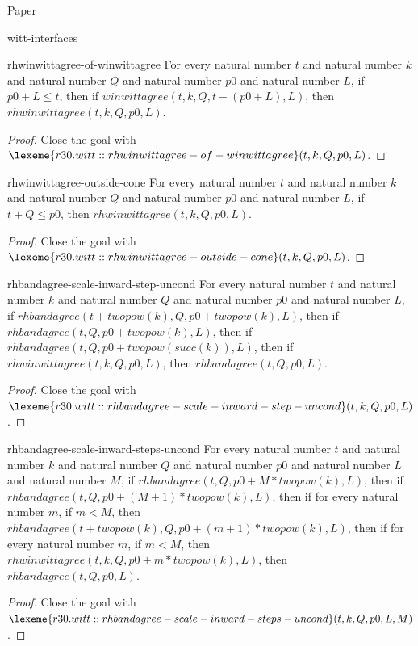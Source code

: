 \begin{lexlean}{Paper}
\begin{section}{witt-interfaces}
  \begin{theorem}{rhwinwittagree-of-winwittagree}
  For every natural number \(t\) and natural number \(k\) and natural number \(Q\) and natural number \(p0\) and natural number \(L\), if \(p0 + L ≤ t\), then if \(winwittagree(t, k, Q, t - (p0 + L), L)\), then \(rhwinwittagree(t, k, Q, p0, L)\).
  \begin{proof}
  Close the goal with \(\lexeme{r30.witt::rhwinwittagree-of-winwittagree}(t, k, Q, p0, L)\).
  \end{proof}
  \end{theorem}

  \begin{theorem}{rhwinwittagree-outside-cone}
  For every natural number \(t\) and natural number \(k\) and natural number \(Q\) and natural number \(p0\) and natural number \(L\), if \(t + Q ≤ p0\), then \(rhwinwittagree(t, k, Q, p0, L)\).
  \begin{proof}
  Close the goal with \(\lexeme{r30.witt::rhwinwittagree-outside-cone}(t, k, Q, p0, L)\).
  \end{proof}
  \end{theorem}

  \begin{theorem}{rhbandagree-scale-inward-step-uncond}
  For every natural number \(t\) and natural number \(k\) and natural number \(Q\) and natural number \(p0\) and natural number \(L\), if \(rhbandagree(t + twopow(k), Q, p0 + twopow(k), L)\), then if \(rhbandagree(t, Q, p0 + twopow(k), L)\), then if \(rhbandagree(t, Q, p0 + twopow(succ(k)), L)\), then if \(rhwinwittagree(t, k, Q, p0, L)\), then \(rhbandagree(t, Q, p0, L)\).
  \begin{proof}
  Close the goal with \(\lexeme{r30.witt::rhbandagree-scale-inward-step-uncond}(t, k, Q, p0, L)\).
  \end{proof}
  \end{theorem}

  \begin{theorem}{rhbandagree-scale-inward-steps-uncond}
  For every natural number \(t\) and natural number \(k\) and natural number \(Q\) and natural number \(p0\) and natural number \(L\) and natural number \(M\), if \(rhbandagree(t, Q, p0 + M * twopow(k), L)\), then if \(rhbandagree(t, Q, p0 + (M + 1) * twopow(k), L)\), then if for every natural number \(m\), if \(m < M\), then \(rhbandagree(t + twopow(k), Q, p0 + (m + 1) * twopow(k), L)\), then if for every natural number \(m\), if \(m < M\), then \(rhwinwittagree(t, k, Q, p0 + m * twopow(k), L)\), then \(rhbandagree(t, Q, p0, L)\).
  \begin{proof}
  Close the goal with \(\lexeme{r30.witt::rhbandagree-scale-inward-steps-uncond}(t, k, Q, p0, L, M)\).
  \end{proof}
  \end{theorem}


\end{section}
\end{lexlean}
